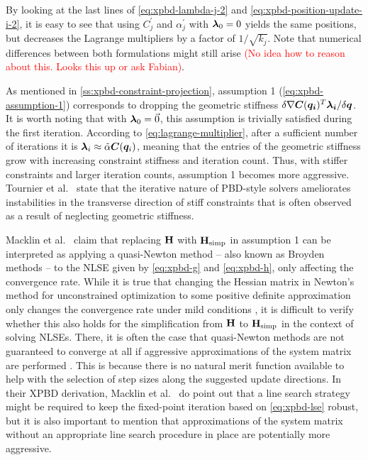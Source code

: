 \noindent By looking at the last lines of \autoref{eq:xpbd-lambda-j-2} and \autoref{eq:xpbd-position-update-i-2}, it is easy to see that using $C^{\prime}_j$ 
and $\alpha^{\prime}_j$ with $\bm{\lambda}_0 = 0$ yields the same positions, but decreases the Lagrange multipliers by a factor of $1 / \sqrt{k_j}$. 
Note that numerical differences between both formulations might still arise \textcolor{red}{(No idea how to reason about this. Looks this up or ask Fabian)}.

As mentioned in \cref{ss:xpbd-constraint-projection}, assumption 1 (\cref{eq:xpbd-assumption-1}) corresponds to dropping the geometric stiffness 
$\delta \nabla \bm{C}(\bm{q_i})^T \bm{\lambda_i} / \delta \bm{q}$. It is worth noting that with $\bm{\lambda}_0 = \vec{0}$, this assumption is 
trivially satisfied during the first iteration. According to \autoref{eq:lagrange-multiplier}, after a sufficient number of iterations it is $\bm{\lambda}_i 
\approx \tilde{\mathbf{\alpha}} \bm{C}(\bm{q}_i)$, meaning that the entries of the geometric stiffness grow with increasing constraint stiffness and iteration
count. Thus, with stiffer constraints and larger iteration counts, assumption 1 becomes more aggressive. Tournier et al.\ \cite{tournier2015} state that
the iterative nature of PBD-style solvers ameliorates instabilities in the transverse direction of stiff constraints that is often observed as a result
of neglecting geometric stiffness.

Macklin et al.\ \cite{macklin2016} claim that replacing $\mathbf{H}$ with $\mathbf{H}_{\text{simp}}$ in assumption 1 can be interpreted as applying a quasi-Newton 
method -- also known as Broyden methods -- to the NLSE given by \autoref{eq:xpbd-g} and \autoref{eq:xpbd-h}, only affecting the convergence rate. While it is 
true that changing the Hessian 
matrix in Newton's method for unconstrained optimization to some positive definite approximation only changes the convergence rate under mild conditions
\cite{nocedal2006}, it is difficult to verify whether this also holds for the simplification from $\mathbf{H}$ to $\mathbf{H}_{\text{simp}}$ in the context of
solving NLSEs. There, it is often the case that quasi-Newton methods are not guaranteed to converge at all if aggressive approximations
of the system matrix are performed \cite{nocedal2006}. This is because there is no natural merit function available to help with the selection of 
step sizes along the suggested update directions. In their XPBD derivation, Macklin et al.\ \cite{macklin2016} do
point out that a line search strategy might be required to keep the fixed-point iteration based on \autoref{eq:xpbd-lse} robust, but it is also important
to mention that approximations of the system matrix without an appropriate line search procedure in place are potentially more aggressive.

